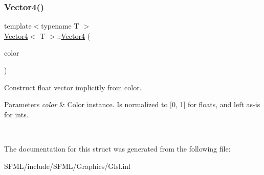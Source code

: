 \subsubsection{\texorpdfstring{Vector4()}{Vector4()}\hspace{0.1cm}{\footnotesize\ttfamily [4/4]}}
{\footnotesize\ttfamily template$<$typename T $>$ \\
\mbox{\hyperlink{struct_vector4}{Vector4}}$<$ T $>$\+::\mbox{\hyperlink{struct_vector4}{Vector4}} (\begin{DoxyParamCaption}\item[{const Color \&}]{color }\end{DoxyParamCaption})\hspace{0.3cm}{\ttfamily [inline]}}



Construct float vector implicitly from color. 


\begin{DoxyParams}{Parameters}
{\em color} & Color instance. Is normalized to \mbox{[}0, 1\mbox{]} for floats, and left as-\/is for ints. \begin{DoxyVerb}\end{DoxyVerb}
 \\
\hline
\end{DoxyParams}


The documentation for this struct was generated from the following file\+:\begin{DoxyCompactItemize}
\item 
S\+F\+M\+L/include/\+S\+F\+M\+L/\+Graphics/Glsl.\+inl\end{DoxyCompactItemize}
